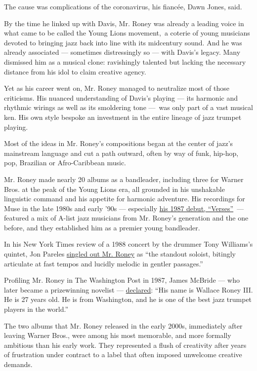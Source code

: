 The cause was complications of the coronavirus, his fiancée, Dawn Jones,
said.

By the time he linked up with Davis, Mr. Roney was already a leading
voice in what came to be called the Young Lions movement,~a coterie of
young musicians devoted to bringing jazz back into line with its
midcentury sound. And he was already associated --- sometimes
distressingly so --- with Davis's legacy. Many dismissed him as a
musical clone: ravishingly talented but lacking the necessary distance
from his idol to claim creative agency.

Yet as his career went on, Mr. Roney managed to neutralize most of those
criticisms. His nuanced understanding of Davis's playing --- its
harmonic and rhythmic wirings as well as its smoldering tone ---~was
only part of a vast musical ken. His own style bespoke an investment in
the entire lineage of jazz trumpet playing.

Most of the ideas in Mr. Roney's compositions began at the center of
jazz's mainstream language and cut a path outward, often by way of funk,
hip-hop, pop, Brazilian or Afro-Caribbean music.

Mr. Roney made nearly 20 albums as a bandleader, including three for
Warner Bros. at the peak of the Young Lions era, all grounded in his
unshakable linguistic command and his appetite for harmonic adventure.
His recordings for Muse in the late 1980s and early '90s --- especially
\href{https://www.youtube.com/watch?v=DJvapwO30Ms}{his 1987 debut,
``Verses''}~--- featured a mix of A-list jazz musicians from Mr. Roney's
generation and the one before, and they established him as a premier
young bandleader.

In his New York Times review of a 1988 concert by the drummer Tony
Williams's quintet, Jon Pareles
\href{https://www.nytimes.com/1988/03/26/arts/review-jazz-a-drummer-who-goads-the-soloists.html}{singled
out Mr. Roney} as ``the standout soloist, bitingly articulate at fast
tempos and lucidly melodic in gentler passages.''

Profiling Mr. Roney in The Washington Post in 1987, James McBride ---
who later became a prizewinning novelist ---
\href{https://www.washingtonpost.com/archive/lifestyle/1987/12/12/wallace-roney-and-the-quest-to-be-heard/8d34f342-850e-49e6-91ac-641832df07d1/}{declared}:
``His name is Wallace Roney III. He is 27 years old. He is from
Washington, and he is one of the best jazz trumpet players in the
world.''

The two albums that Mr. Roney released in the early 2000s, immediately
after leaving Warner Bros., were among his most memorable, and more
formally ambitious than his early work. They represented a flush of
creativity after years of frustration under contract to a label that
often imposed unwelcome creative demands.

